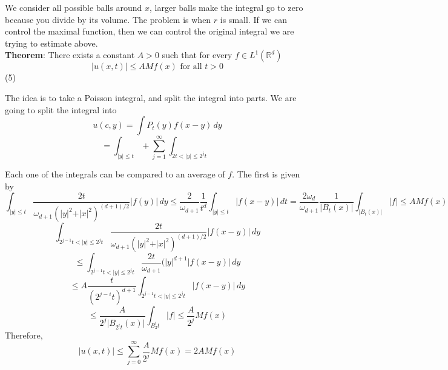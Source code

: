 \documentclass[12pt]{article}
\begin{document}
We consider all possible balls around $x$, larger balls make the integral go to zero because you divide by its volume. The problem is when $r$ is small. If we can control the maximal function, then we can control the original integral we are trying to estimate above. \\ 

\noindent \textbf{Theorem}: There exists a constant $A > 0$ such that for every $f \in L^1(\mathbb{R}^d)$
$$\vert u(x,t) \vert \leq A Mf(x) \text{ for all } t > 0$$
(5)

\noindent The idea is to take a Poisson integral, and split the integral into parts. We are going to split the integral into
$$u(c,y) = \int P_t(y)f(x-y) \,dy$$
$$ = \int_{\vert y \vert \leq t} + \sum_{j=1}^\infty \int_{2t < \vert y \vert \leq 2^jt}$$

Each one of the integrals can be compared to an average of $f$. The first is given by 
$$\int_{\vert y \vert \leq t} \frac{2t}{\omega_{d+1}(\vert y\vert^2 + \vert x \vert^2)^{(d+1)/2}} \vert f(y) \vert \,dy \leq \frac{2}{\omega_{d+1}} \frac{1}{t^d} \int_{\vert y \vert \leq t} \vert f(x-y) \vert \,dt = \frac{2\omega_d}{\omega_{d+1}} \frac{1}{\vert B_t(x)\vert } \int_{\vert B_t(x)\vert } \vert f \vert \leq A Mf(x)$$
$$ \int_{2^{j-1}t < \vert y \vert \leq 2^jt} \frac{2t}{\omega_{d+1}(\vert y\vert^2 + \vert x \vert^2)^{(d+1)/2}} \vert f(x-y) \vert \,dy $$ 
$$\leq \int_{2^{j-1}t < \vert y \vert \leq 2^jt} \frac{2t}{\omega_{d+1}}(\vert y\vert^{d+1} \vert f(x-y) \vert \,dy $$
$$\leq A \frac{t}{(2^{j-i}t)^{d+1}} \int_{2^{j-1}t < \vert y \vert \leq 2^jt} \vert f(x-y) \vert \,dy$$
$$\leq \frac{A}{2^j \vert B_{2^it}(x)\vert} \int_{B_2^it} \vert f \vert \leq \frac{A}{2^j} Mf(x)$$
Therefore, 
$$\vert u(x,t) \vert \leq \sum^\infty_{j=0} \frac{A}{2^j} Mf(x) = 2 A Mf(x)$$
\end{document}
